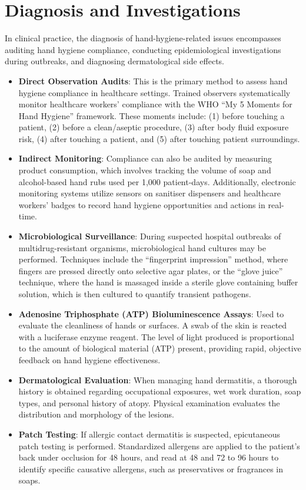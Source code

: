 \section*{Diagnosis and Investigations}
In clinical practice, the diagnosis of hand-hygiene-related issues encompasses auditing hand hygiene compliance, conducting epidemiological investigations during outbreaks, and diagnosing dermatological side effects.
\begin{itemize}
    \item \textbf{Direct Observation Audits}: This is the primary method to assess hand hygiene compliance in healthcare settings. Trained observers systematically monitor healthcare workers' compliance with the WHO ``My 5 Moments for Hand Hygiene'' framework. These moments include: (1) before touching a patient, (2) before a clean/aseptic procedure, (3) after body fluid exposure risk, (4) after touching a patient, and (5) after touching patient surroundings.
    \item \textbf{Indirect Monitoring}: Compliance can also be audited by measuring product consumption, which involves tracking the volume of soap and alcohol-based hand rubs used per 1,000 patient-days. Additionally, electronic monitoring systems utilize sensors on sanitiser dispensers and healthcare workers' badges to record hand hygiene opportunities and actions in real-time.
    \item \textbf{Microbiological Surveillance}: During suspected hospital outbreaks of multidrug-resistant organisms, microbiological hand cultures may be performed. Techniques include the ``fingerprint impression'' method, where fingers are pressed directly onto selective agar plates, or the ``glove juice'' technique, where the hand is massaged inside a sterile glove containing buffer solution, which is then cultured to quantify transient pathogens.
    \item \textbf{Adenosine Triphosphate (ATP) Bioluminescence Assays}: Used to evaluate the cleanliness of hands or surfaces. A swab of the skin is reacted with a luciferase enzyme reagent. The level of light produced is proportional to the amount of biological material (ATP) present, providing rapid, objective feedback on hand hygiene effectiveness.
    \item \textbf{Dermatological Evaluation}: When managing hand dermatitis, a thorough history is obtained regarding occupational exposures, wet work duration, soap types, and personal history of atopy. Physical examination evaluates the distribution and morphology of the lesions.
    \item \textbf{Patch Testing}: If allergic contact dermatitis is suspected, epicutaneous patch testing is performed. Standardized allergens are applied to the patient's back under occlusion for 48 hours, and read at 48 and 72 to 96 hours to identify specific causative allergens, such as preservatives or fragrances in soaps.
\end{itemize}

